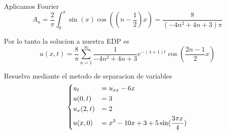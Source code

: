 \documentclass[../main.tex]{subfiles}
\begin{document}
\begin{solution}
  Aplicamos Fourier
  \begin{equation*}
    A_{n} = \frac{2}{\pi} \int_{0}^{\pi} \sin(x) \cos((n - \frac12)x) = \frac{8}{(-4n^{2} + 4n + 3) \pi}
  \end{equation*}

  Por lo tanto la solucion a nuestra EDP es
  \begin{equation*}
    u(x, t) = \frac{8}{\pi} \sum_{n = 1}^{\infty} \frac{1}{-4n^{2} + 4n + 3} e^{-(\lambda + 1)t} \cos(\frac{2n - 1}{2}x)
  \end{equation*}
\end{solution}

\begin{problem}
  Resuelva mediante el metodo de separacion de variables
  \begin{equation*}
  \begin{dcases}
    u_t &= u_{xx} - 6x\\
    u(0, t) &= 3\\
    u_{x}(2, t) &= 2\\
    u(x, 0) &= x^{3} - 10x + 3 + 5 \sin(\frac{3\pi x}{4})
  \end{dcases}
  \end{equation*}
\end{problem}
\end{document}
